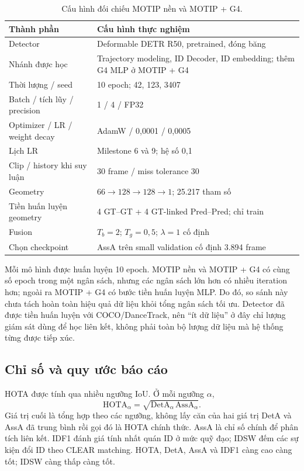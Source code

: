 \begin{table}[!htbp]
\centering
\caption{Cấu hình đối chiếu MOTIP nền và MOTIP + G4.}\label{tab:3}

\begin{tabularx}{\linewidth}{>{\raggedright\arraybackslash}p{.29\linewidth}X}
\toprule
\textbf{Thành phần} & \textbf{Cấu hình thực nghiệm} \\
\midrule
Detector & Deformable DETR R50, pretrained, đóng băng \\
Nhánh được học & Trajectory modeling, ID Decoder, ID embedding; thêm G4 MLP ở MOTIP + G4 \\
Thời lượng / seed & 10 epoch; 42, 123, 3407 \\
Batch / tích lũy / precision & 1 / 4 / FP32 \\
Optimizer / LR / weight decay & AdamW / 0,0001 / 0,0005 \\
Lịch LR & Milestone 6 và 9; hệ số 0,1 \\
Clip / history khi suy luận & 30 frame / miss tolerance 30 \\
Geometry & $66\to128\to128\to1$; 25.217 tham số \\
Tiền huấn luyện geometry & 4 GT–GT + 4 GT-linked Pred–Pred; chỉ train \\
Fusion & $T_b=2$; $T_g=0{,}5$; $\lambda=1$ cố định \\
Chọn checkpoint & AssA trên small validation cố định 3.894 frame \\
\bottomrule
\end{tabularx}
\end{table}

Mỗi mô hình được huấn luyện 10 epoch. MOTIP nền và MOTIP + G4 có cùng số epoch trong một ngân sách, nhưng các ngân sách lớn hơn có nhiều iteration hơn; ngoài ra MOTIP + G4 có bước tiền huấn luyện MLP. Do đó, so sánh này chưa tách hoàn toàn hiệu quả dữ liệu khỏi tổng ngân sách tối ưu. Detector đã được tiền huấn luyện với COCO/DanceTrack, nên “ít dữ liệu” ở đây chỉ lượng giám sát dùng để học liên kết, không phải toàn bộ lượng dữ liệu mà hệ thống từng được tiếp xúc.

\FloatBarrier
\subsection{Chỉ số và quy ước báo cáo}
HOTA được tính qua nhiều ngưỡng IoU. Ở mỗi ngưỡng $\alpha$,
\begin{equation}
 \mathrm{HOTA}_{\alpha}
   =\sqrt{\mathrm{DetA}_{\alpha}\,\mathrm{AssA}_{\alpha}}.
 \label{eq:hota}
\end{equation}
Giá trị cuối là tổng hợp theo các ngưỡng, không lấy căn của hai giá trị DetA
và AssA đã trung bình rồi gọi đó là HOTA chính thức. AssA là chỉ số chính để
phân tích liên kết. IDF1 đánh giá tính nhất quán ID ở mức quỹ đạo; IDSW đếm các
sự kiện đổi ID theo CLEAR matching. HOTA, DetA, AssA và IDF1 càng cao càng tốt;
IDSW càng thấp càng tốt.

